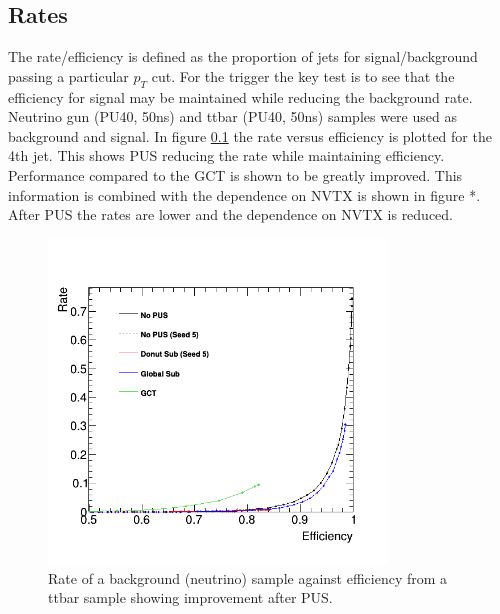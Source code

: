 \subsection{Rates}
The rate/efficiency is defined as the proportion of jets for signal/background passing a particular $p_{T}$ cut. For the trigger the key test is to see that the efficiency for signal may be maintained while reducing the background rate. Neutrino gun (PU40, 50ns) and ttbar (PU40, 50ns) samples were used as background and signal. In figure \ref{} the rate versus efficiency is plotted for the 4th jet. This shows PUS reducing the rate while maintaining efficiency. Performance compared to the GCT is shown to be greatly improved. This information is combined with the dependence on NVTX is shown in figure *. After PUS the rates are lower and the dependence on NVTX is reduced. 
\begin{figure}
\centering
    \includegraphics[width=0.8\textwidth]{Figures/rateeffjet4}
  \caption{Rate of a background (neutrino) sample against efficiency from a ttbar sample showing improvement after PUS.}
  \label{rateff}
\end{figure}
